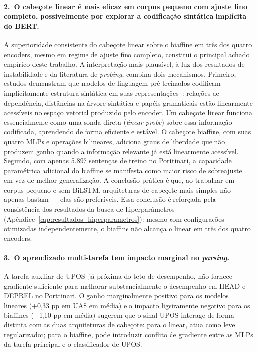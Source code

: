 \paragraph{2.\ O cabeçote linear é mais eficaz em corpus pequeno com ajuste fino completo,
possivelmente por explorar a codificação sintática implícita do BERT.}
A superioridade consistente do cabeçote linear sobre o biaffine em três dos quatro encoders,
mesmo em regime de ajuste fino completo, constitui o principal achado empírico deste trabalho.
A interpretação mais plausível, à luz dos resultados de instabilidade e da literatura de
\textit{probing}, combina dois mecanismos. Primeiro, estudos demonstram que modelos de
linguagem pré-treinados codificam implicitamente estrutura sintática em suas
representações~\citep{tenney2019bert,hewitt2019structural}: relações de dependência, distâncias
na árvore sintática e papéis gramaticais estão linearmente acessíveis no espaço vetorial
produzido pelo encoder. Um cabeçote linear funciona essencialmente como uma sonda direta
(\textit{linear probe}) sobre essa informação codificada, aprendendo de forma eficiente e
estável. O cabeçote biaffine, com suas quatro MLPs e operações bilineares, adiciona graus de
liberdade que não produzem ganho quando a informação relevante já está linearmente acessível.
Segundo, com apenas 5.893 sentenças de treino no Porttinari, a capacidade paramétrica
adicional do biaffine se manifesta como maior risco de sobreajuste em vez de melhor
generalização. A conclusão prática é que, ao trabalhar em corpus pequeno e sem BiLSTM,
arquiteturas de cabeçote mais simples não apenas bastam — elas são preferíveis. Essa conclusão
é reforçada pela consistência dos resultados da busca de hiperparâmetros
(Apêndice~\ref{cap:resultados_hiperparametros}): mesmo com configurações otimizadas
independentemente, o biaffine não alcança o linear em três dos quatro encoders.

\paragraph{3.\ O aprendizado multi-tarefa tem impacto marginal no \textit{parsing}.}
A tarefa auxiliar de UPOS, já próxima do teto de desempenho, não fornece gradiente suficiente
para melhorar substancialmente o desempenho em HEAD e DEPREL no Porttinari. O ganho marginalmente
positivo para os modelos lineares (+0,33 pp em UAS em média) e o impacto ligeiramente negativo
para os biaffines ($-$1,10 pp em média) sugerem que o sinal UPOS interage de forma distinta com
as duas arquiteturas de cabeçote: para o linear, atua como leve regularizador; para o biaffine,
pode introduzir conflito de gradiente entre as MLPs da tarefa principal e o classificador de UPOS.

